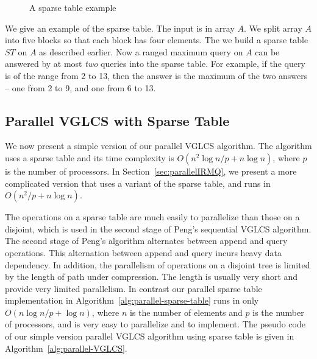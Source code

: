 \begin{figure}[!thb]
  \centering {} 
  \caption{A sparse table example}
  \label{fig:interval-decomposition}
\end{figure}

We give an example of the sparse table.  The input is in array $A$. We
split array $A$ into five blocks so that each block has four elements.
The we build a sparse table $ST$ on $A$ as described earlier.  Now a
ranged maximum query on $A$ can be answered by at most {\em two}
queries into the sparse table.  For example, if the query is of the
range from 2 to 13, then the answer is the maximum of the two answers
-- one from 2 to 9, and one from 6 to 13.

\subsection{Parallel VGLCS with Sparse Table}

We now present a simple version of our parallel VGLCS algorithm.  The
algorithm uses a sparse table and its time complexity is $O(n^2 \log n
/ p + n \log n)$, where $p$ is the number of processors.  In
Section~\ref{sec:parallelIRMQ}, we present a more complicated version
that uses a variant of the sparse table, and runs in $O(n^2 / p + n
\log n)$.




The operations on a sparse table are much easily to parallelize than
those on a disjoint, which is used in the second stage of Peng's
sequential VGLCS algorithm.  The second stage of Peng's algorithm
alternates between append and query operations.  This alternation
between append and query incurs heavy data dependency.  In addition,
the parallelism of operations on a disjoint tree is limited by the
length of path under compression.  The length is usually very short
and provide very limited parallelism.  In contrast our parallel sparse
table implementation in Algorithm~\ref{alg:parallel-sparse-table} runs
in only $O(n \log n / p + \log n)$, where $n$ is the number of
elements and $p$ is the number of processors, and is very easy to
parallelize and to implement.  The pseudo code of our simple version
parallel VGLCS algorithm using sparse table is given in
Algorithm~\ref{alg:parallel-VGLCS}.


